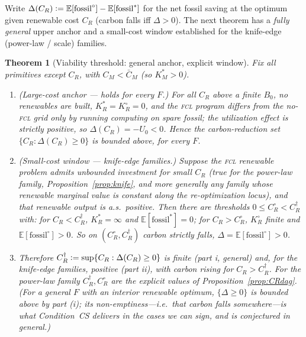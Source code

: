 \documentclass[11pt,reqno]{amsart}
\theoremstyle{plain}
\newtheorem{theorem}{Theorem}
\theoremstyle{definition}
\theoremstyle{remark}
\newcommand{\KRs}{K_R^{*}}
\newcommand{\KMs}{K_M^{*}}
\newcommand{\KRo}{K_R^{\circ}}
\newcommand{\CM}{C_M}
\newcommand{\CR}{C_R}
\newcommand{\CMbar}{\bar C_M}
\newcommand{\E}{\mathbb{E}}
\newcommand{\eqdef}{\vcentcolon=}
\begin{document}
Write $\Delta(\CR)\eqdef\E[\text{fossil}^{\circ}]-\E[\text{fossil}^{*}]$ for the
net fossil saving at the optimum given renewable cost $\CR$ (carbon falls iff
$\Delta>0$). The next theorem has a \emph{fully general} upper anchor and a
small-cost window established for the knife-edge (power-law / scale) families.

\begin{theorem}[Viability threshold: general anchor, explicit window]\label{thm:carbon}
Fix all primitives except $\CR$, with $\CM<\CMbar$ (so $\KMs>0$).
\begin{enumerate}[label=(\roman*),leftmargin=2.2em]
  \item \textup{(Large-cost anchor --- holds for every $F$.)} For all $\CR$ above a
        finite $B_0$, no renewables are built, $\KRs=\KRo=0$, and the \textsc{fcl}
        program differs from the no-\textsc{fcl} grid only by running computing on
        spare fossil; the utilization effect is strictly positive, so
        $\Delta(\CR)=-U_0<0$. Hence the carbon-reduction set $\{\CR:\Delta(\CR)\ge0\}$
        is bounded above, for \emph{every} $F$.
  \item \textup{(Small-cost window --- knife-edge families.)} Suppose the
        \textsc{fcl} renewable problem admits unbounded investment for small $\CR$
        (true for the power-law family, Proposition~\ref{prop:knife}, and more
        generally any family whose renewable marginal value is constant along the
        re-optimization locus), and that renewable output is a.s.\ positive. Then
        there are thresholds $0\le\CR^{\circ}<\CR^{\dagger}$ with: for
        $\CR<\CR^{\dagger}$, $\KRs=\infty$ and $\E[\text{fossil}^{*}]=0$; for
        $\CR>\CR^{\circ}$, $\KRo$ finite and $\E[\text{fossil}^{\circ}]>0$. So on
        $(\CR^{\circ},\CR^{\dagger})$ carbon strictly falls,
        $\Delta=\E[\text{fossil}^{\circ}]>0$.
  \item Therefore $\CR^{\dagger}\eqdef\sup\{\CR:\Delta(\CR)\ge0\}$ is finite (part
        i, general) and, for the knife-edge families, positive (part ii), with
        carbon rising for $\CR>\CR^{\dagger}$. For the power-law family
        $\CR^{\dagger},\CR^{\circ}$ are the explicit values of
        Proposition~\ref{prop:CRdag}. \emph{(For a general $F$ with an interior
        renewable optimum, $\{\Delta\ge0\}$ is bounded above by part (i); its
        non-emptiness---i.e.\ that carbon falls somewhere---is what Condition~CS
        delivers in the cases we can sign, and is conjectured in general.)}
\end{enumerate}
\end{theorem}
\end{document}
